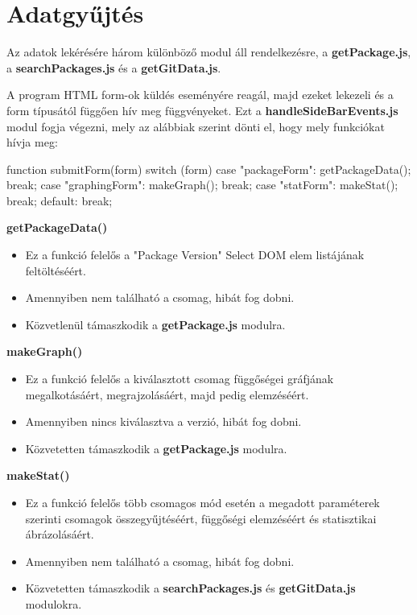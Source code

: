 \pagebreak

\section{Adatgyűjtés}

Az adatok lekérésére három különböző modul áll rendelkezésre, a \textbf{getPackage.js}, a \textbf{searchPackages.js} és a \textbf{getGitData.js}.

A program HTML form-ok küldés eseményére reagál, majd ezeket lekezeli és a form típusától függően hív meg függvényeket. Ezt a \textbf{handleSideBarEvents.js} modul fogja végezni, mely az alábbiak szerint dönti el, hogy mely funkciókat hívja meg:

\begin{js}
function submitForm(form){
	switch (form) {
		case "packageForm":
		getPackageData();
		break;
		case "graphingForm":
		makeGraph();
		break;
		case "statForm":
		makeStat();
		break;
		default:
		break;
	}
}
\end{js}

\noindent\textbf{getPackageData()}
\begin{itemize}
	\item Ez a funkció felelős a "Package Version" Select DOM elem listájának feltöltéséért. 
	\item Amennyiben nem található a csomag, hibát fog dobni.
	\item Közvetlenül támaszkodik a \textbf{getPackage.js} modulra.
\end{itemize}

\noindent\textbf{makeGraph()}
\begin{itemize}
	\item Ez a funkció felelős a kiválasztott csomag függőségei gráfjának megalkotásáért, megrajzolásáért, majd pedig elemzéséért.
	\item Amennyiben nincs kiválasztva a verzió, hibát fog dobni.
	\item Közvetetten támaszkodik a \textbf{getPackage.js} modulra.
\end{itemize}

\noindent\textbf{makeStat()}
\begin{itemize}
	\item Ez a funkció felelős több csomagos mód esetén a megadott paraméterek szerinti csomagok összegyűjtéséért, függőségi elemzéséért és statisztikai ábrázolásáért.
	\item Amennyiben nem található a csomag, hibát fog dobni.
	\item Közvetetten támaszkodik a \textbf{searchPackages.js} és \textbf{getGitData.js} modulokra.
\end{itemize}

